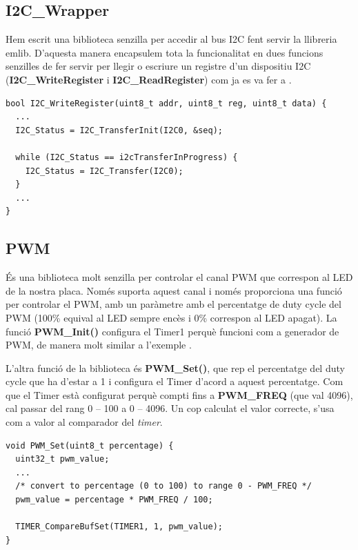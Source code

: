 \subsection{I2C\_Wrapper}

Hem escrit una biblioteca senzilla per accedir al bus \gls{I2C} fent servir la llibreria emlib. D'aquesta manera encapsulem tota la funcionalitat en dues funcions senzilles de fer servir per llegir o escriure un registre d'un dispositiu I2C ({\bf I2C\_WriteRegister} i {\bf I2C\_ReadRegister}) com ja es va fer a .

\begin{lstlisting}[style=customc, caption={Part de la funció {\bf I2C\_WriteRegister}}, label=I2CWriteRegister]
bool I2C_WriteRegister(uint8_t addr, uint8_t reg, uint8_t data) {
  ...
  I2C_Status = I2C_TransferInit(I2C0, &seq);

  while (I2C_Status == i2cTransferInProgress) {
    I2C_Status = I2C_Transfer(I2C0);
  }
  ...
}
\end{lstlisting}


\subsection{PWM}
És una biblioteca molt senzilla per controlar el canal PWM que correspon al LED de la nostra placa. Només suporta aquest canal i només proporciona una funció per controlar el PWM, amb un paràmetre amb el percentatge de \gls{duty cycle} del PWM (100\% equival al LED sempre encès i 0\% correspon al LED apagat).
La funció {\bf PWM\_Init()} configura el Timer1 perquè funcioni com a generador de \gls{PWM}, de manera molt similar a l'exemple .

L'altra funció de la biblioteca és {\bf PWM\_Set()}, que rep el percentatge del \gls{duty cycle} que ha d'estar a 1 i configura el Timer d'acord a aquest percentatge. Com que el Timer està configurat perquè compti fins a {\bf PWM\_FREQ} (que val 4096), cal passar del rang 0 -- 100 a 0 -- 4096. Un cop calculat el valor correcte, s'usa com a valor al comparador del {\em timer}.

\begin{lstlisting}[style=customc,caption={Funció PWM\_Set()},label=PWMSet]
void PWM_Set(uint8_t percentage) {
  uint32_t pwm_value;
  ...
  /* convert to percentage (0 to 100) to range 0 - PWM_FREQ */
  pwm_value = percentage * PWM_FREQ / 100;

  TIMER_CompareBufSet(TIMER1, 1, pwm_value);
}
\end{lstlisting}


